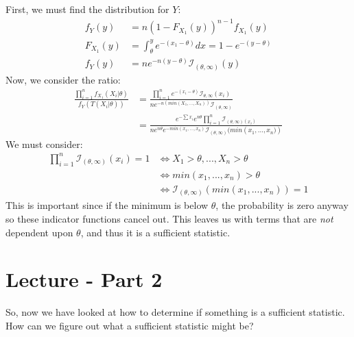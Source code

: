 \documentclass{article}
\begin{document}
\begin{enumerate}
    First, we must find the distribution for $Y$:
    \begin{equation*}
    \begin{split}
        f_Y(y) &= n(1-F_{X_1}(y))^{n-1} f_{X_1}(y)\\
        F_{X_1}(y) &= \int_{\theta}^y e^{-(x_1-\theta)}dx = 1-e^{-(y-\theta)}\\
        f_Y(y) &= ne^{-n(y-\theta)}\mathcal{I}_{(\theta,\infty)}(y)
    \end{split}
    \end{equation*}
    Now, we consider the ratio:
    \begin{equation*}
        \begin{split}
            \frac{\prod_{i=1}^n f_{X_1}(X_i|\theta)}{f_Y(T(X_i|\theta))} &= \frac{\prod_{i=1}^n e^{-(x_i-\theta)}\mathcal{I}_{\theta,\infty}(x_i)}{ne^{-n\left(min(X_1,...,X_n)\right)} \mathcal{I}_{(\theta,\infty)}}\\
            &= \frac{e^{-\sum x_i} e^{n\theta} \prod_{i=1}^n \mathcal{I}_{(\theta,\infty)(x_i)}}{ne^{n\theta}e^{-min(x_1,...,x_n)} \mathcal{I}_{(\theta,\infty)}(min\left(x_1,...,x_n)\right)}
        \end{split}
    \end{equation*}
    We must consider:
    \begin{equation*}
    \begin{split}
        \prod_{i=1}^n \mathcal{I}_{(\theta,\infty)}(x_i) = 1 &\iff X_1>\theta,...,X_n > \theta\\
        &\iff min(x_1,...,x_n)>\theta\\
        &\iff \mathcal{I}_{(\theta,\infty)}(min(x_1,...,x_n)) = 1
    \end{split}
    \end{equation*}
    This is important since if the minimum is below $\theta$, the probability is zero anyway so these indicator functions cancel out. This leaves us with terms that are \textit{not} dependent upon $\theta$, and thus it is a sufficient statistic.
\end{enumerate}

\section{Lecture - Part 2}

So, now we have looked at how to determine if something is a sufficient statistic. How can we figure out what a sufficient statistic might be?
\end{document}
